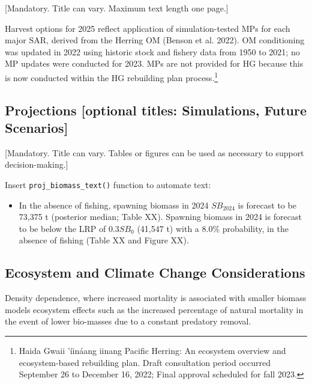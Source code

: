 \documentclass[11pt]{book}
\begin{document}
{[}Mandatory. Title can vary. Maximum text length one page.{]}

Harvest options for 2025 reflect application of simulation-tested MPs for each major SAR, derived from the Herring OM (Benson et al. 2022). OM conditioning was updated in 2022 using historic stock and fishery data from 1950 to 2021; no MP updates were conducted for 2023. MPs are not provided for HG because this is now conducted within the HG rebuilding plan process.\footnote{Haida Gwaii 'íináang \textbar{} iinang Pacific Herring: An ecosystem overview and ecosystem-based rebuilding plan. Draft consultation period occurred September 26 to December 16, 2022; Final approval scheduled for fall 2023.}

\hypertarget{projections-optional-titles-simulations-future-scenarios}{%
\subsection*{Projections {[}optional titles: Simulations, Future Scenarios{]}}\label{projections-optional-titles-simulations-future-scenarios}}

{[}Mandatory. Title can vary. Tables or figures can be used as necessary to support decision-making.{]}

Insert \texttt{proj\_biomass\_text()} function to automate text:
\begin{itemize}

\item
  In the absence of fishing, spawning biomass in 2024 \(\mathit{SB}_{2024}\) is forecast to be 73,375 t (posterior median; Table XX). Spawning biomass in 2024 is forecast to be below the LRP of \(0.3\mathit{SB}_0\) (41,547 t) with a 8.0\% probability, in the absence of fishing (Table XX and Figure XX).
\end{itemize}
\hypertarget{ecosystem-and-climate-change-considerations-1}{%
\subsection*{Ecosystem and Climate Change Considerations}\label{ecosystem-and-climate-change-considerations-1}}

Density dependence, where increased mortality is associated with smaller biomass models ecosystem effects such as the increased percentage of natural mortality in the event of lower bio-masses due to a constant predatory removal.
\end{document}
